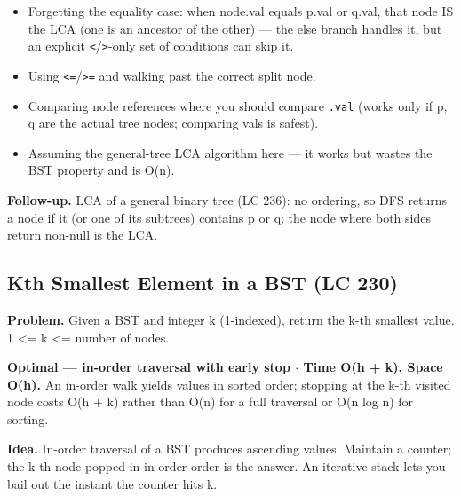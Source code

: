 \documentclass[11pt]{article}
\providecommand{\tightlist}{\setlength{\itemsep}{1pt}\setlength{\parskip}{0pt}}
\begin{document}
\begin{itemize}
\tightlist
\item
  Forgetting the equality case: when node.val equals p.val or q.val, that node IS the LCA (one is an ancestor of the other) --- the else branch handles it, but an explicit \texttt{\textless{}}/\texttt{\textgreater{}}-only set of conditions can skip it.
\item
  Using \texttt{\textless{}=}/\texttt{\textgreater{}=} and walking past the correct split node.
\item
  Comparing node references where you should compare \texttt{.val} (works only if p, q are the actual tree nodes; comparing vals is safest).
\item
  Assuming the general-tree LCA algorithm here --- it works but wastes the BST property and is O(n).
\end{itemize}

\textbf{Follow-up.} LCA of a general binary tree (LC 236): no ordering, so DFS returns a node if it (or one of its subtrees) contains p or q; the node where both sides return non-null is the LCA.

\subsection{Kth Smallest Element in a BST (LC 230)}\label{kth-smallest-element-in-a-bst-lc-230}

\textbf{Problem.} Given a BST and integer k (1-indexed), return the k-th smallest value. 1 \textless= k \textless= number of nodes.

\textbf{Optimal --- in-order traversal with early stop \(\cdot\) Time O(h + k), Space O(h).} An in-order walk yields values in sorted order; stopping at the k-th visited node costs O(h + k) rather than O(n) for a full traversal or O(n log n) for sorting.

\textbf{Idea.} In-order traversal of a BST produces ascending values. Maintain a counter; the k-th node popped in in-order order is the answer. An iterative stack lets you bail out the instant the counter hits k.

\end{document}
